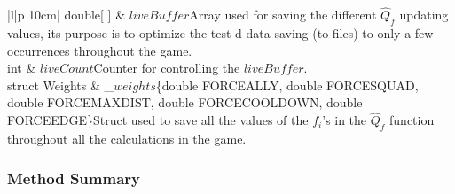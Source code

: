 \begin{centering}
\begin{table}[H]
\begin{tabular}{|l|p {10cm}|}
 	\hline
 	double[ ] &  $liveBuffer$\linebreak  Array used for saving the different $\hat{Q}_f$ updating values, its purpose is to optimize the test d data saving (to files) to only a few occurrences throughout the game. \\
 	\hline
 	int &  $liveCount$\linebreak  Counter for controlling the $liveBuffer$.\\
 	\hline
 	struct Weights & \_$weights$\{double FORCEALLY, double FORCESQUAD, double FORCEMAXDIST, double FORCECOOLDOWN, double FORCEEDGE\}\linebreak  Struct used to save all the values of the $f_i$'s in the $\hat{Q}_f$ function throughout all the calculations in the game. \\
 	\hline
\end{tabular}
\end{table}
\end{centering}

\pagebreak
\subsubsection{Method Summary}

